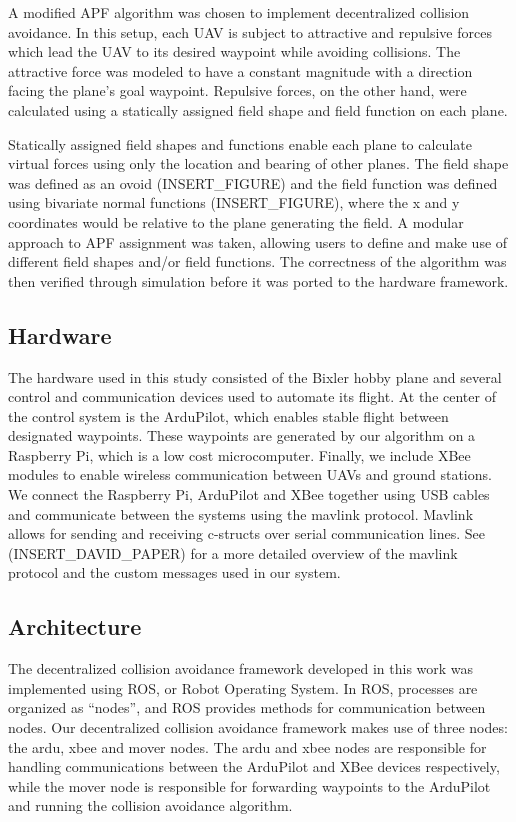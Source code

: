 \documentclass[conference]{IEEEtran}
\begin{document}
A modified APF algorithm was chosen to implement decentralized collision avoidance.  In this setup, each UAV is subject to attractive and repulsive forces which lead the UAV to its desired waypoint while avoiding collisions. The attractive force was modeled to have a constant magnitude with a direction facing the plane's goal waypoint. Repulsive forces, on the other hand, were calculated using a statically assigned field shape and field function on each plane. 

Statically assigned field shapes and functions enable each plane to calculate virtual forces using only the location and bearing of other planes.  The field shape was defined as an ovoid (INSERT\_FIGURE) and the field function was defined using bivariate normal functions (INSERT\_FIGURE), where the x and y coordinates would be relative to the plane generating the field.  A modular approach to APF assignment was taken, allowing users to define and make use of different field shapes and/or field functions. The correctness of the algorithm was then verified through simulation before it was ported to the hardware framework.


\subsection{Hardware}

The hardware used in this study consisted of the Bixler hobby plane and several control and communication devices used to automate its flight.  At the center of the control system is the ArduPilot, which enables stable flight between designated waypoints.  These waypoints are generated by our algorithm on a Raspberry Pi, which is a low cost microcomputer. Finally, we include XBee modules to enable wireless communication between UAVs and ground stations.  We connect the Raspberry Pi, ArduPilot and XBee  together using USB cables and communicate between the systems using the mavlink protocol.  Mavlink allows for sending and receiving c-structs over serial communication lines. See (INSERT\_DAVID\_PAPER) for a more detailed overview of the mavlink protocol and the custom messages used in our system.

\subsection{Architecture}

The decentralized collision avoidance framework developed in this work was implemented using ROS, or Robot Operating System. In ROS, processes are organized as “nodes”, and ROS provides methods for communication between nodes.   Our decentralized collision avoidance framework makes use of three nodes: the ardu, xbee and mover nodes.  The ardu and xbee nodes are responsible for handling communications between the ArduPilot and XBee devices respectively, while the mover node is responsible for forwarding waypoints to the ArduPilot and running the collision avoidance algorithm.  
\end{document}
